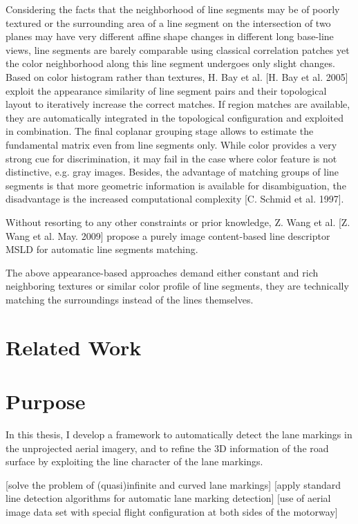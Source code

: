Considering the facts that the neighborhood of line segments may be of poorly textured or the surrounding area of a line segment on the intersection of two planes may have very different affine shape changes in different long base-line views, line segments are barely comparable using classical correlation patches yet the color neighborhood along this line segment undergoes only slight changes. Based on color histogram rather than textures, H. Bay et al. [H. Bay et al. 2005] exploit the appearance similarity of line segment pairs and their topological layout to iteratively increase the correct matches. If region matches are available, they are automatically integrated in the topological configuration and exploited in combination. The final coplanar grouping stage allows to estimate the fundamental matrix even from line segments only. While color provides a very strong cue for discrimination, it may fail in the case where color feature is not distinctive, e.g. gray images. Besides, the advantage of matching groups of line segments is that more geometric information is available for disambiguation, the disadvantage is the increased computational complexity [C. Schmid et al. 1997].

Without resorting to any other constraints or prior knowledge, Z. Wang et al. [Z. Wang et al. May. 2009] propose a purely image content-based line descriptor MSLD for automatic line segments matching. 

The above appearance-based approaches demand either constant and rich neighboring textures or similar color profile of line segments, they are technically matching the surroundings instead of the lines themselves.

\section{Related Work}


\section{Purpose}

In this thesis, I develop a framework to automatically detect the lane markings in the unprojected aerial imagery, and to refine the 3D information of the road surface by exploiting the line character of the lane markings.

[solve the problem of (quasi)infinite and curved lane markings]
[apply standard line detection algorithms for automatic lane marking detection]
[use of aerial image data set with special flight configuration at both sides of the motorway]


